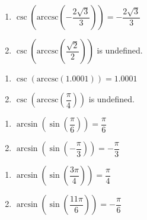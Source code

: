 \begin{multicols}{2}

\begin{enumerate}

\setcounter{enumi}{\value{HW}}

\item $\csc\left(\text{arccsc}\left(-\dfrac{2\sqrt{3}}{3}\right)\right) = -\dfrac{2\sqrt{3}}{3}$
\item $\csc\left(\text{arccsc}\left(\dfrac{\sqrt{2}}{2}\right)\right)$ is undefined.

\setcounter{HW}{\value{enumi}}

\end{enumerate}

\end{multicols}

\begin{multicols}{2}

\begin{enumerate}

\setcounter{enumi}{\value{HW}}

\item $\csc\left(\text{arccsc}\left(1.0001\right)\right) = 1.0001$ 
\item $\csc\left(\text{arccsc}\left( \dfrac{\pi}{4} \right)\right)$ is undefined.

\setcounter{HW}{\value{enumi}}

\end{enumerate}

\end{multicols}

\begin{multicols}{2}

\begin{enumerate}

\setcounter{enumi}{\value{HW}}

\item  $\arcsin\left(\sin\left(\dfrac{\pi}{6}\right) \right) = \dfrac{\pi}{6}$
\item  $\arcsin\left(\sin\left(-\dfrac{\pi}{3}\right) \right) = -\dfrac{\pi}{3}$

\setcounter{HW}{\value{enumi}}

\end{enumerate}

\end{multicols}

\begin{multicols}{2}

\begin{enumerate}

\setcounter{enumi}{\value{HW}}

\item  $\arcsin\left(\sin\left(\dfrac{3\pi}{4}\right) \right) = \dfrac{\pi}{4}$
\item  $\arcsin\left(\sin\left(\dfrac{11\pi}{6}\right) \right) = -\dfrac{\pi}{6}$

\setcounter{HW}{\value{enumi}}

\end{enumerate}

\end{multicols}

